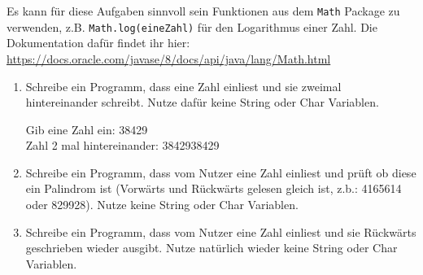 \documentclass{../../sheet}
\begin{document}
Es kann für diese Aufgaben sinnvoll sein Funktionen aus dem \texttt{Math} Package zu verwenden, z.B. \texttt{Math.log(eineZahl)} für den Logarithmus einer Zahl. Die Dokumentation dafür findet ihr hier: \url{https://docs.oracle.com/javase/8/docs/api/java/lang/Math.html}
\begin{enumerate}
    \item Schreibe ein Programm, dass eine Zahl einliest und sie zweimal hintereinander schreibt. Nutze dafür keine String oder Char Variablen.
    \begin{ausgabe}
Gib eine Zahl ein: 38429\\
Zahl 2 mal hintereinander: 3842938429
    \end{ausgabe}
    \item Schreibe ein Programm, dass vom Nutzer eine Zahl einliest und prüft ob diese ein Palindrom ist (Vorwärts und Rückwärts gelesen gleich ist, z.b.: 4165614 oder 829928). Nutze keine String oder Char Variablen.
    \item Schreibe ein Programm, dass vom Nutzer eine Zahl einliest und sie Rückwärts geschrieben wieder ausgibt. Nutze natürlich wieder keine String oder Char Variablen.
\end{enumerate}
\end{document}
